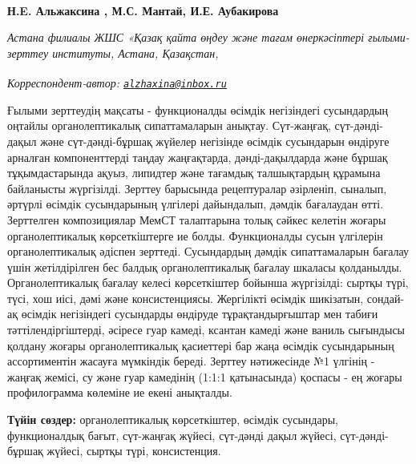 
\begin{articleheader}

{\bfseries Н.E. Альжаксина\textsuperscript{\envelope } \authorid,
М.С. Мантай\authorid,
И.Е. Аубакирова\authorid}
\end{articleheader}

\begin{affiliation}
\emph{Астана филиалы ЖШС «Қазақ қайта өңдеу және тағам өнеркәсіптері ғылыми-зерттеу институты, Астана, Қазақстан,}

\raggedright \textsuperscript{\envelope }{\em Корреспондент-автор: \href{mailto:alzhaxina@inbox.ru}{\nolinkurl{alzhaxina@inbox.ru}}}
\end{affiliation}

Ғылыми зерттеудің мақсаты - функционалды өсімдік негізіндегі сусындардың
оңтайлы органолептикалық сипаттамаларын анықтау. Сүт-жаңғақ,
сүт-дәнді-дақыл және сүт-дәнді-бұршақ жүйелер негізінде өсімдік
сусындарын өндіруге арналған компоненттерді таңдау жаңғақтарда,
дәнді-дақылдарда және бұршақ тұқымдастарында ақуыз, липидтер және
тағамдық талшықтардың құрамына байланысты жүргізілді. Зерттеу барысында
рецептуралар әзірленіп, сыналып, әртүрлі өсімдік сусындарының үлгілері
дайындалып, дәмдік бағалаудан өтті. Зерттелген композициялар МемСТ
талаптарына толық сәйкес келетін жоғары органолептикалық көрсеткіштерге
ие болды. Функционалды сусын үлгілерін органолептикалық әдіспен
зерттеді. Сусындардың дәмдік сипаттамаларын бағалау үшін жетілдірілген
бес балдық органолептикалық бағалау шкаласы қолданылды. Органолептикалық
бағалау келесі көрсеткіштер бойынша жүргізілді: сыртқы түрі, түсі, хош
иісі, дәмі және консистенциясы. Жергілікті өсімдік шикізатын, сондай-ақ
өсімдік негізіндегі сусындарды өндіруде тұрақтандырғыштар мен табиғи
тәттілендіргіштерді, әсіресе гуар камеді, ксантан камеді және ваниль
сығындысы қолдану жоғары органолептикалық қасиеттері бар жаңа өсімдік
сусындарының ассортиментін жасауға мүмкіндік береді. Зерттеу нәтижесінде
№1 үлгінің - жаңғақ жемісі, су және гуар камедінің (1:1:1 қатынасында)
қоспасы - ең жоғары профилограмма көлеміне ие екені анықталды.

{\bfseries Түйін сөздер:} органолептикалық көрсеткіштер, өсімдік сусындары,
функционалдық бағыт, сүт-жаңғақ жүйесі, сүт-дәнді дақыл жүйесі,
сүт-дәнді-бұршақ жүйесі, сыртқы түрі, консистенция.

